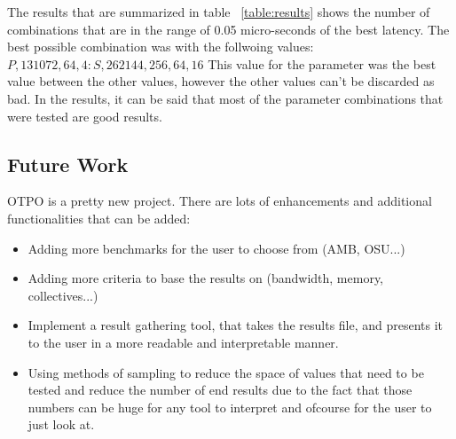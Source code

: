 The results that are summarized in table ~\ref{table:results} shows the number
of combinations that are in the range of 0.05 micro-seconds of the best
latency. The best possible combination was with the follwoing values:
$P,131072,64,4:S,262144,256,64,16$
This value for the parameter was the best value between the other values,
however the other values can't be discarded as bad. In the results, it can be
said that most of the parameter combinations that were tested are good
results. 

\subsection{Future Work}
OTPO is a pretty new project. There are lots of enhancements and additional
functionalities that can be added:
\begin{itemize}
\item Adding more benchmarks for the user to choose from (AMB, OSU...)
\item Adding more criteria to base the results on (bandwidth, memory,
  collectives...)
\item Implement a result gathering tool, that takes the results file, and
  presents it to the user in a more readable and interpretable manner.
\item Using methods of sampling to reduce the space of values that need to be
  tested and reduce the number of end results due to the fact that those
  numbers can be huge for any tool to interpret and ofcourse for the user to
  just look at.
\end{itemize}

